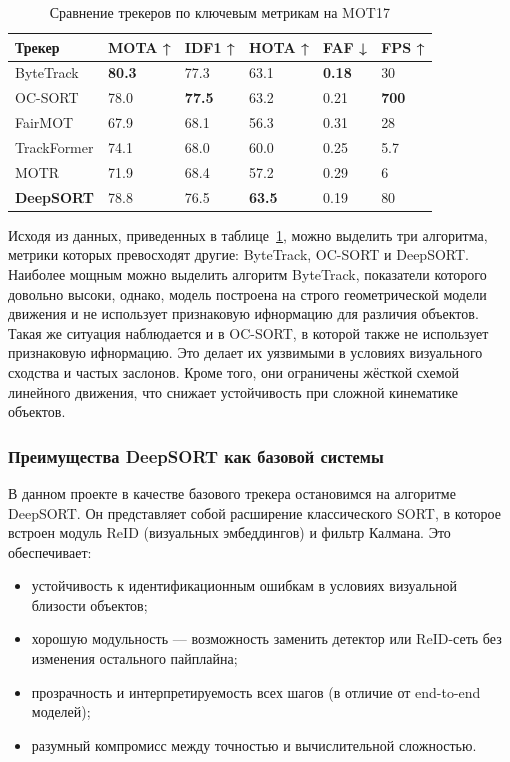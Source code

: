 \begin{table}[h!]
\centering
\caption{Сравнение трекеров по ключевым метрикам на MOT17}
\label{tab:mot_comparison}
	\begin{tabular}{|p{3.5cm}|p{2cm}|p{2cm}|p{2cm}|p{2cm}|p{2cm}|}
		\hline
		\textbf{Трекер} 	& MOTA ↑ 		& IDF1 ↑ 		& HOTA ↑		& FAF ↓			& FPS ↑			\\
		\hline
		ByteTrack 			& \textbf{80.3} & 77.3			& 63.1 			& \textbf{0.18}	& 30  			\\
		OC-SORT 			& 78.0 			& \textbf{77.5} & 63.2 			& 0.21 			& \textbf{700} 	\\
		FairMOT 			& 67.9 			& 68.1 			& 56.3 			& 0.31 			& 28  			\\
		TrackFormer 		& 74.1 			& 68.0 			& 60.0 			& 0.25 			& 5.7  			\\
		MOTR 				& 71.9 			& 68.4 			& 57.2 			& 0.29			& 6 			\\
		\textbf{DeepSORT} 	& 78.8 			& 76.5 			& \textbf{63.5}	& 0.19			& 80 			\\
	\hline
	\end{tabular}
\end{table}

Исходя из данных, приведенных в таблице~\ref{tab:mot_comparison}, можно выделить три алгоритма, метрики которых превосходят другие: ByteTrack, OC-SORT и DeepSORT. Наиболее мощным можно выделить алгоритм ByteTrack, показатели которого довольно высоки, однако, модель построена на строго геометрической модели движения и не использует признаковую ифнормацию для различия объектов. Такая же ситуация наблюдается и в OC-SORT, в которой также не использует признаковую ифнормацию. Это делает их уязвимыми в условиях визуального сходства и частых заслонов. Кроме того, они ограничены жёсткой схемой линейного движения, что снижает устойчивость при сложной кинематике объектов.

\subsubsection{Преимущества DeepSORT как базовой системы}

В данном проекте в качестве базового трекера остановимся на алгоритме DeepSORT. Он представляет собой расширение классического SORT, в которое встроен модуль ReID (визуальных эмбеддингов) и фильтр Калмана. Это обеспечивает:

\begin{itemize}
    \item устойчивость к идентификационным ошибкам в условиях визуальной близости объектов;
    \item хорошую модульность — возможность заменить детектор или ReID-сеть без изменения остального пайплайна;
    \item прозрачность и интерпретируемость всех шагов (в отличие от end-to-end моделей);
    \item разумный компромисс между точностью и вычислительной сложностью.
\end{itemize}

